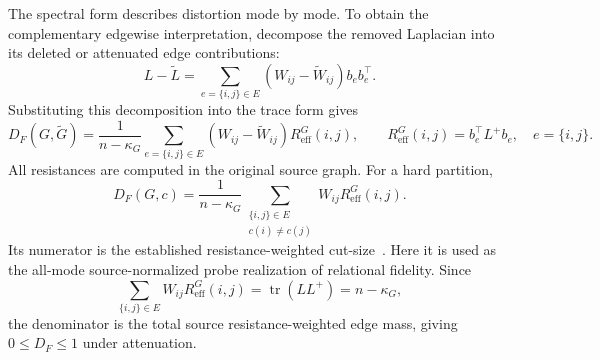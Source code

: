 The spectral form describes distortion mode by mode.
To obtain the complementary edgewise interpretation, decompose the removed Laplacian into its deleted or attenuated edge contributions:
\[
L-\widetilde L
=
\sum_{e=\{i,j\}\in E}(W_{ij}-\widetilde W_{ij})b_e b_e^\top.
\]
Substituting this decomposition into the trace form gives
\begin{equation}
D_F(G,\widetilde G)
=\frac1{n-\kappa_G}\sum_{e=\{i,j\}\in E}(W_{ij}-\widetilde W_{ij})R_{\mathrm{eff}}^G(i,j),
\qquad R_{\mathrm{eff}}^G(i,j)=b_e^\top L^+b_e,\quad e=\{i,j\}.
\label{eq:resistance-weighted-dirichlet-distortion}
\end{equation}
All resistances are computed in the original source graph.
For a hard partition,
\begin{equation}
D_F(G,c)=\frac1{n-\kappa_G}
\sum_{\substack{\{i,j\}\in E\\c(i)\ne c(j)}}
W_{ij}R_{\mathrm{eff}}^G(i,j).
\label{eq:hard-partition-dirichlet-distortion}
\end{equation}
Its numerator is the established resistance-weighted cut-size~\citep{cesabianchi2013random,gentile2013online}.
Here it is used as the all-mode source-normalized probe realization of relational fidelity.
Since
\[
\sum_{\{i,j\}\in E}W_{ij}R_{\mathrm{eff}}^G(i,j)
=
\operatorname{tr}(LL^+)
=
n-\kappa_G,
\]
the denominator is the total source resistance-weighted edge mass, giving $0\le D_F\le1$ under attenuation.

